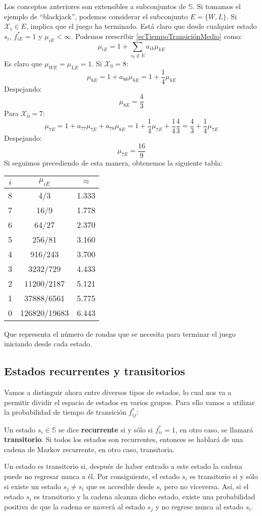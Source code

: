 Los conceptos anteriores son extensibles a subconjuntos de $\mathbb{S}$. Si tomamos el ejemplo de \enquote{blackjack}, podemos considerar el subconjunto $E=\{W,L\}$. Si $\mathcal{X}_t\in E$, implica que el juego ha terminado. Está claro que desde cualquier estado $s_i$, $f_{iE}^*=1$ y $\mu_{iE}<\infty$. Podemos reescribir \ref{ecTiempoTransiciónMedio} como:
\[\mu_{iE}=1+\sum_{s_k\notin E}a_{ik}\mu_{kE}\]
Es claro que $\mu_{WE}=\mu_{LE}=1$. Si $\mathcal{X}_0=8$:
\[\mu_{8E}=1+a_{88}\mu_{8E}=1+\dfrac{1}{4}\mu_{8E}\]
Despejando:
\[\mu_{8E}=\dfrac{4}{3}\]
Para $\mathcal{X}_0=7$:
\[\mu_{7E}=1+a_{77}\mu_{7E}+a_{78}\mu_{8E}=1+\dfrac{1}{4}\mu_{7E}+\dfrac{1}{4}\dfrac{4}{3}=\dfrac{4}{3}+\dfrac{1}{4}\mu_{7E}\]
Despejando:
\[\mu_{7E}=\dfrac{16}{9}\]
Si seguimos precediendo de esta manera, obtenemos la siguiente tabla:
\begin{center}
    \begin{tabular}{|c|c|c|}
        \hline
        $i$ & $\mu_{iE}$ & $\approx$  \\
        \hline   
        8 & 4/3 & 1.333 \\
        \hline
        7 & 16/9 & 1.778 \\
        \hline
        6 & 64/27 & 2.370\\
        \hline
        5 & 256/81 & 3.160 \\
        \hline
        4 & 916/243 & 3.700\\
        \hline
        3 & 3232/729 & 4.433\\
        \hline
        2 & 11200/2187 & 5.121\\
        \hline
        1 & 37888/6561 & 5.775\\
        \hline
        0 & 126820/19683 & 6.443\\
        \hline
    \end{tabular}
\end{center} 
Que representa el número de rondas que se necesita para terminar el juego iniciando desde cada estado.


\subsection{Estados recurrentes y transitorios}
Vamos a distinguir ahora entre diversos tipos de estados, lo cual nos va a permitir dividir el espacio de estados en varios grupos. Para ello vamos a utilizar la probabilidad de tiempo de transición $f_{ij}^*$:
\begin{definition}
Un estado $s_i\in\mathbb{S}$ se dice \textbf{recurrente} si y sólo si $f_{ii}^*=1$, en otro caso, se llamará \textbf{transitorio}. Si todos los estados son recurrentes, entonces se hablará de una cadena de Markov recurrente, en otro caso, transitoria.
\end{definition}
Un estado es transitorio si, después de haber entrado a este estado la cadena puede no regresar nunca a él. Por consiguiente, el estado $s_i$ es transitorio si y sólo si existe un estado $s_j\neq s_i$ que es accesible desde $s_i$ pero no viceversa. Así, si el estado $s_i$ es transitorio y la cadena alcanza dicho estado, existe una probabilidad positiva de que la cadena se moverá al estado $s_j$ y no regrese nunca al estado $s_i$.

